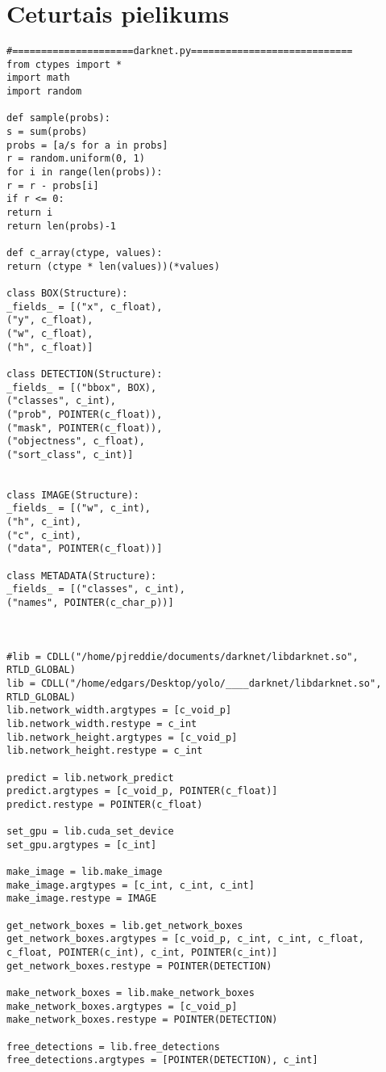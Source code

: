 \documentclass[12pt,paper=a4]{report}
\begin{document}
\chapter{Ceturtais pielikums}
\label{appendix:pielikums4}
\begin{lstlisting}[basicstyle=\tiny]
#=====================darknet.py============================
from ctypes import *
import math
import random

def sample(probs):
s = sum(probs)
probs = [a/s for a in probs]
r = random.uniform(0, 1)
for i in range(len(probs)):
r = r - probs[i]
if r <= 0:
return i
return len(probs)-1

def c_array(ctype, values):
return (ctype * len(values))(*values)

class BOX(Structure):
_fields_ = [("x", c_float),
("y", c_float),
("w", c_float),
("h", c_float)]

class DETECTION(Structure):
_fields_ = [("bbox", BOX),
("classes", c_int),
("prob", POINTER(c_float)),
("mask", POINTER(c_float)),
("objectness", c_float),
("sort_class", c_int)]


class IMAGE(Structure):
_fields_ = [("w", c_int),
("h", c_int),
("c", c_int),
("data", POINTER(c_float))]

class METADATA(Structure):
_fields_ = [("classes", c_int),
("names", POINTER(c_char_p))]



#lib = CDLL("/home/pjreddie/documents/darknet/libdarknet.so", RTLD_GLOBAL)
lib = CDLL("/home/edgars/Desktop/yolo/____darknet/libdarknet.so", RTLD_GLOBAL)
lib.network_width.argtypes = [c_void_p]
lib.network_width.restype = c_int
lib.network_height.argtypes = [c_void_p]
lib.network_height.restype = c_int

predict = lib.network_predict
predict.argtypes = [c_void_p, POINTER(c_float)]
predict.restype = POINTER(c_float)

set_gpu = lib.cuda_set_device
set_gpu.argtypes = [c_int]

make_image = lib.make_image
make_image.argtypes = [c_int, c_int, c_int]
make_image.restype = IMAGE

get_network_boxes = lib.get_network_boxes
get_network_boxes.argtypes = [c_void_p, c_int, c_int, c_float, c_float, POINTER(c_int), c_int, POINTER(c_int)]
get_network_boxes.restype = POINTER(DETECTION)

make_network_boxes = lib.make_network_boxes
make_network_boxes.argtypes = [c_void_p]
make_network_boxes.restype = POINTER(DETECTION)

free_detections = lib.free_detections
free_detections.argtypes = [POINTER(DETECTION), c_int]


\end{lstlisting}
\end{document}
